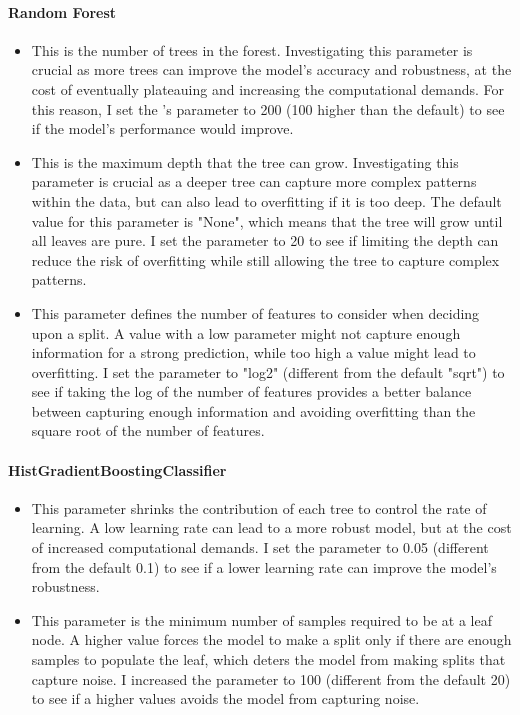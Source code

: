 \documentclass{article}
\begin{document}
\paragraph{Random Forest}

\begin{itemize}
  \item {} This is the number of trees in the forest. Investigating this parameter is crucial as more trees can improve the model's accuracy and robustness, at the cost of eventually plateauing and increasing the computational demands. For this reason, I set the 's parameter to 200 (100 higher than the default) to see if the model's performance would improve.
  \item {} This is the maximum depth that the tree can grow. Investigating this parameter is crucial as a deeper tree can capture more complex patterns within the data, but can also lead to overfitting if it is too deep. The default value for this parameter is "None", which means that the tree will grow until all leaves are pure. I set the  parameter to 20 to see if limiting the depth can reduce the risk of overfitting while still allowing the tree to capture complex patterns.
  \item {} This parameter defines the number of features to consider when deciding upon a split. A value with a low parameter might not capture enough information for a strong prediction, while too high a value might lead to overfitting. I set the  parameter to "log2" (different from the default "sqrt") to see if taking the log of the number of features provides a better balance between capturing enough information and avoiding overfitting than the square root of the number of features.
\end{itemize}

\paragraph{HistGradientBoostingClassifier}

\begin{itemize}
  \item{} This parameter shrinks the contribution of each tree to control the rate of learning. A low learning rate can lead to a more robust model, but at the cost of increased computational demands. I set the  parameter to 0.05 (different from the default 0.1) to see if a lower learning rate can improve the model's robustness.
  \item{} This parameter is the minimum number of samples required to be at a leaf node. A higher value forces the model to make a split only if there are enough samples to populate the leaf, which deters the model from making splits that capture noise. I increased the  parameter to 100 (different from the default 20) to see if a higher values avoids the model from capturing noise.

\end{itemize}
\end{document}
